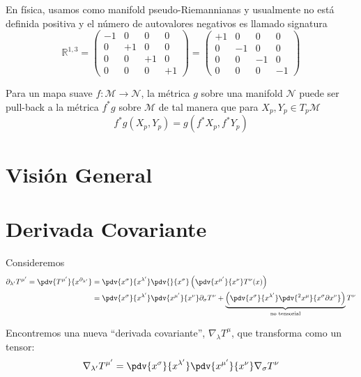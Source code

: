 \documentclass[../main]{subfiles}
\begin{document}
\begin{adjustwidth}{0pt}{-100pt}
En física, usamos como manifold pseudo-Riemannianas y usualmente no está definida positiva y el número de autovalores negativos es llamado signatura
\begin{equation}
    \mathbb{R}^{1, 3}=
    \begin{pmatrix}
        -1 & 0 & 0 & 0 \\
        0 & +1 & 0 & 0 \\
        0 & 0 & +1 & 0 \\
        0 & 0 & 0 & +1 
    \end{pmatrix}
    =
    \begin{pmatrix}
        +1 & 0 & 0 & 0 \\
        0 & -1 & 0 & 0 \\
        0 & 0 & -1 & 0 \\
        0 & 0 & 0 & -1 
    \end{pmatrix}
\end{equation}

Para un mapa suave $f:\mathcal{M}\rightarrow \mathcal{N}$, la métrica $g$ sobre una manifold $\mathcal{N}$ puede ser pull-back a la métrica $f^* g$ sobre $\mathcal{M}$ de tal manera que para $X_p, Y_p \in T_p \mathcal{M}$
\begin{equation}
    f^* g(X_p, Y_p)=g(f^* X_p, f^* Y_p)
\end{equation}

\section{Visión General}\label{part4.2}

\section{Derivada Covariante}\label{part4.3}
Consideremos 
\begin{equation}
    \begin{aligned}
        \partial_{\lambda'}T^{\mu'}=\pdv{T^{\mu'}}{x^{\partial_{\lambda'}}}&=\pdv{x^{\sigma}}{x^{\lambda'}}\pdv{}{x^{\sigma}}\left(\pdv{x^{\mu'}}{x^{\nu}}T^{\nu}(x)\right)\\
        &=\pdv{x^{\sigma}}{x^{\lambda'}}\pdv{x^{\mu'}}{x^{\nu}}\partial_{\sigma} T^{\nu}+\underbrace{\left(\pdv{x^{\sigma}}{x^{\lambda'}}\pdv{^2 x^{\mu}}{x^{\sigma}\partial x^{\nu}}\right)}_{\text{no tensorial}} T^{\nu}
    \end{aligned}
\end{equation}

Encontremos una nueva ``derivada covariante'', $\nabla_{\lambda}T^{\mu}$, que transforma como un tensor:
\begin{equation}
    \nabla_{\lambda'}T^{\mu'}=\pdv{x^{\sigma}}{x^{\lambda'}}\pdv{x^{\mu'}}{x^{\nu}}\nabla_{\sigma}T^{\nu}
\end{equation}


\end{adjustwidth}
\end{document}
